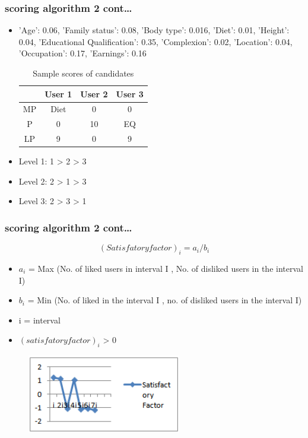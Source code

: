 \documentclass[10pt, compress]{beamer}
\begin{document}
\begin{frame}[fragile]
  \frametitle{scoring algorithm 2 cont\ldots}
  \begin{itemize}
  \item<1>'Age': 0.06, 'Family status': 0.08, 'Body type': 0.016, 'Diet': 0.01, 'Height': 0.04, 'Educational Qualification': 0.35, 'Complexion': 0.02, 'Location': 0.04, 'Occupation': 0.17, 'Earnings': 0.16
  \begin{table}
    \caption{Sample scores of candidates}
    \begin{tabular}{cccc}
      \toprule
  & User 1 & User 2 & User 3\\
       \midrule
      MP & Diet & 0 & 0\\
\hline
P & 0 & 10 & EQ\\
\hline
LP & 9 & 0 & 9\\
     \bottomrule
    \end{tabular}
  \end{table}
 \item<1> Level 1: 1 > 2 > 3
 \item<1> Level 2: 2 > 1 > 3
 \item<1> Level 3: 2 > 3 > 1
 
  \end{itemize}
\end{frame}

\begin{frame}[fragile]
  \frametitle{scoring algorithm 2 cont\ldots}
   \begin{equation*}
   (Satisfatory factor)_i  = a_i/b_i
   \end{equation*}
  \begin{itemize}
  \item<1>$a_i$ = Max (No. of liked users in interval I , No. of disliked users in the interval I)
 \item<1> $b_i$ = Min (No. of liked in the interval I , no. of disliked users in the interval I)
 \item<1> i = interval
 \item<1> \Sigma $(satisfatory factor)_i$ > 0
  \end{itemize}
  \begin{figure}[h!]
    \centering
    \includegraphics[width=0.6\textwidth]{images/graph.PNG}
    \label{fig:graph}
\end{figure}
  \end{frame}
\end{document}
